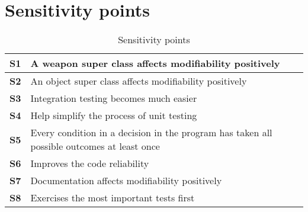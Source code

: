 \section{Sensitivity points}

\begin{table}[H]
\small
\begin{tabular}{| p{} | p{} |} \hline
{\bf S1} & A weapon super class affects modifiability positively \\ \hline
{\bf S2} & An object super class affects modifiability positively \\ \hline
{\bf S3} & Integration testing becomes much easier \\ \hline
{\bf S4} & Help simplify the process of unit testing \\ \hline
{\bf S5} & Every condition in a decision in the program has taken all possible outcomes at least once \\ \hline
{\bf S6} & Improves the code reliability \\ \hline
{\bf S7} & Documentation affects modifiability positively \\ \hline
{\bf S8} & Exercises the most important tests first \\ \hline
\end{tabular}
\caption{Sensitivity points}
\end{table}







